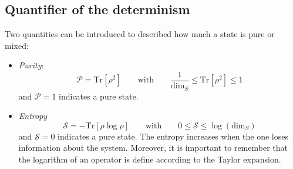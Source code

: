 \subsection{Quantifier of the determinism}
Two quantities can be introduced to described how much a state is pure or mixed:
\begin{itemize}
    \item \textit{Purity}: 
    \begin{equation}
        \label{eq:purity}
        \mathcal{P} = \text{Tr}[\rho^2] \qquad \text{with} \qquad \frac{1}{\text{dim}_S} \leq \text{Tr}[\rho^2] \leq 1
    \end{equation}
    and $\mathcal{P} = 1$ indicates a pure state. 
    \item \textit{Entropy}
    \begin{equation}
        \label{eq:entropy}
        \mathcal{S} = -\text{Tr}[\rho \log \rho] \qquad \text{with} \qquad 0 \leq \mathcal{S} \leq \log{(\text{dim}_S)}
    \end{equation}
    and $\mathcal{S} = 0$ indicates a pure state. The entropy increases when the one loses information about the system. Moreover, it is important to remember that the logarithm of an operator is define according to the Taylor expansion. 
\end{itemize}

